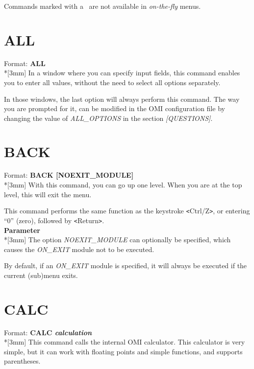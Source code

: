 \documentclass[a4paper]{book}
\newcommand{\lt}{\texttt{<}}
\newcommand{\gt}{\texttt{>}}
\renewcommand{\indent}{\hspace*{5mm}}
\begin{document}
Commands marked with a \dag\ are not available in 
\textsl{on-the-fly} menus.

\section{ALL}
\label{subsec:mylabel9}

\indent Format: \textbf{ALL}\\*[3mm]
In a window where you can specify input fields, this command enables you to 
enter all values, without the need to select all options separately.

In those windows, the last option will always perform this command. The way 
you are prompted for it, can be modified in the OMI configuration file by 
changing the value of \textsl{ALL{\_}OPTIONS} in the section \textsl{[QUESTIONS]}.

\section{BACK}
\label{subsec:mylabel10}

\indent Format: \textbf{BACK [NOEXIT{\_}MODULE]}\\*[3mm]
With this command, you can go up one level. When you are at the top level, 
this will exit the menu.

This command performs the same function as the keystroke \lt Ctrl/Z\gt, or 
entering ``0'' (zero), followed by \lt Return\gt.\\[3mm]
\textbf{Parameter}\\*[3mm]
The option \textsl{NOEXIT{\_}MODULE} can optionally be specified, which causes the 
\textsl{ON{\_}EXIT} module not to be executed.

By default, if an \textsl{ON{\_}EXIT} module is specified, it will always be executed 
if the current (sub)menu exits.

\section{CALC}
\label{subsec:mylabel11}

\indent Format: \textbf{CALC \textit{calculation}}\\*[3mm]
This command calls the internal OMI calculator. This calculator is very 
simple, but it can work with floating points and simple functions, and 
supports parentheses.
\end{document}
